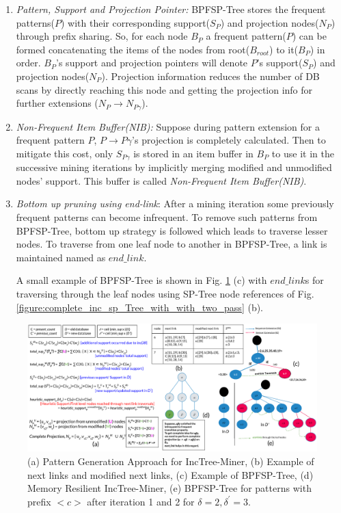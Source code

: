 \begin{enumerate}
    \item \textit{Pattern, Support and Projection Pointer: }BPFSP-Tree stores the frequent patterns($P$) with their corresponding support($S_{P}$) and projection nodes($N_{P}$) through prefix sharing. So, for each node $B_{P}$ a frequent pattern($P$) can be formed concatenating the items of the nodes from root($B_{root}$) to it($B_{P}$) in order. $B_{P}$'s support and projection pointers will denote $P$'s support($S_{P}$) and projection nodes($N_{P}$). Projection information reduces the number of DB scans by directly reaching this node and getting the projection info for further extensions ($N_{P} \to N_{P\gamma}$).

    \item \textit{Non-Frequent Item Buffer(NIB): }Suppose during pattern extension for a frequent pattern $P$, $P \to P\gamma$'s projection is completely calculated. Then to mitigate this cost, only $S_{P\gamma}$ is stored in an item buffer in $B_{P}$ to use it in the successive mining iterations by implicitly merging modified and unmodified nodes' support. This buffer is called \textit{Non-Frequent Item Buffer(NIB)}.

    \item \textit{Bottom up pruning using end-link}: After a mining iteration some previously frequent patterns can become infrequent. To remove such patterns from BPFSP-Tree, bottom up strategy is followed which leads to traverse lesser nodes. To traverse from one leaf node to another in BPFSP-Tree, a link is maintained named as $end\_link$.

     A small example of BPFSP-Tree is shown in Fig. \ref{figure:inc_tree_miner_additional_image} (c) with $end\_link$s for traversing through the leaf nodes using SP-Tree node references of Fig. \ref{figure:complete_inc_sp_Tree_with_with_two_pass} (b).
\end{enumerate}

\begin{figure}[!tb]
\centering
\includegraphics[width=\textwidth]{incremental_mining_merge_im1}
\caption{(a) Pattern Generation Approach for IncTree-Miner, (b) Example of next links and modified next links, (c) Example of BPFSP-Tree, (d) Memory Resilient IncTree-Miner, (e) BPFSP-Tree for patterns with prefix $< c >$ after iteration 1 and 2 for $\delta=2, \delta^{\prime}=3$.} \label{figure:inc_tree_miner_additional_image}
\hfil
\end{figure}

